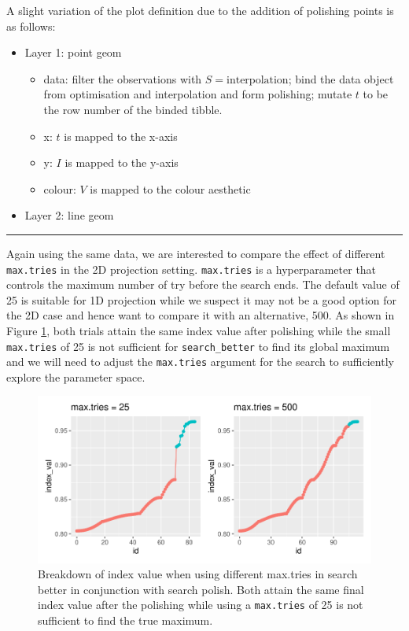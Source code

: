 \documentclass[12pt]{article}
\providecommand{\tightlist}{%
  \setlength{\itemsep}{0pt}\setlength{\parskip}{0pt}}
\begin{document}
A slight variation of the plot definition due to the addition of
polishing points is as follows:

\begin{itemize}
\tightlist
\item
  Layer 1: point geom

  \begin{itemize}
  \tightlist
  \item
    data: filter the observations with \(S = \text{interpolation}\);
    bind the data object from optimisation and interpolation and form
    polishing; mutate \(t\) to be the row number of the binded tibble.
  \item
    x: \(t\) is mapped to the x-axis
  \item
    y: \(I\) is mapped to the y-axis
  \item
    colour: \(V\) is mapped to the colour aesthetic
  \end{itemize}
\item
  Layer 2: line geom
\end{itemize}

\begin{center}\rule{0.5\linewidth}{0.5pt}\end{center}

Again using the same data, we are interested to compare the effect of
different \texttt{max.tries} in the 2D projection setting.
\texttt{max.tries} is a hyperparameter that controls the maximum number
of try before the search ends. The default value of 25 is suitable for
1D projection while we suspect it may not be a good option for the 2D
case and hence want to compare it with an alternative, 500. As shown in
Figure \ref{trace-compare}, both trials attain the same index value
after polishing while the small \texttt{max.tries} of 25 is not
sufficient for \texttt{search\_better} to find its global maximum and we
will need to adjust the \texttt{max.tries} argument for the search to
sufficiently explore the parameter space.

\begin{figure}
\centering
\includegraphics{paper_files/figure-latex/polish-1.pdf}
\caption{\label{trace-compare}Breakdown of index value when using
different max.tries in search better in conjunction with search polish.
Both attain the same final index value after the polishing while using a
\texttt{max.tries} of 25 is not sufficient to find the true maximum.}
\end{figure}
\end{document}
